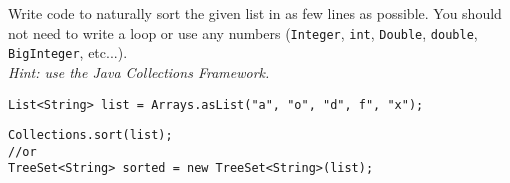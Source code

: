 Write code to naturally sort the given list in as few lines as possible. 
You should not need to write a loop or use any numbers (\texttt{Integer}, \texttt{int}, \texttt{Double}, \texttt{double},
\texttt{BigInteger}, etc...). \\
\textit{Hint: use the Java Collections Framework.}
\begin{verbatim}
List<String> list = Arrays.asList("a", "o", "d", f", "x");
\end{verbatim}
\begin{answer}
\begin{verbatim}
Collections.sort(list);
//or
TreeSet<String> sorted = new TreeSet<String>(list);
\end{verbatim}
\end{answer}
